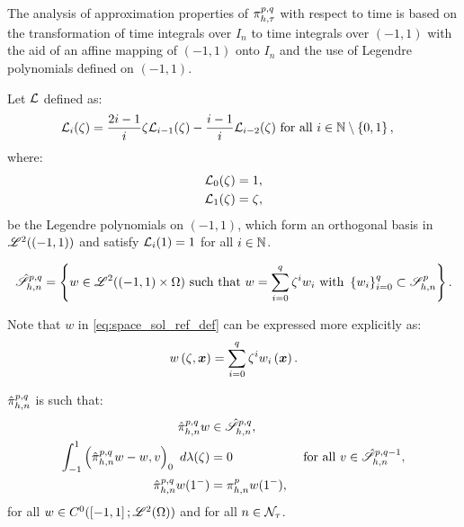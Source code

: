 The analysis of approximation properties of $\pi_{h, \tau}^{p, q}$ with respect to time is based on the transformation of time integrals over $I_n$ to time integrals over $\left( -1, 1 \right)$ with the aid of an affine mapping of $\left( -1, 1 \right)$ onto $I_n$ and the use of Legendre polynomials defined on $\left( -1, 1 \right)$.

\begin{definition}
    Let $\mathcal{L}$ defined as:
    \begin{align}
        \mathcal{L}_{i}(\zeta) = \frac{2i - 1}{i} \zeta \mathcal{L}_{i - 1}(\zeta) - \frac{i - 1}{i} \mathcal{L}_{i - 2}(\zeta) &\text{ for all } i \in \mathbb{N} \setminus \left\{ 0, 1 \right\},
    \end{align}
    where:
    \begin{align}
        \mathcal{L}_{0}(\zeta) &= 1, \\
        \mathcal{L}_{1}(\zeta) &= \zeta,
    \end{align}
    be the Legendre polynomials on $\left( -1, 1 \right)$, which form an orthogonal basis in $\mathscr{L}^{2}(\left( -1, 1 \right))$ and satisfy $\mathcal{L}_i(1) = 1$ for all $i \in \mathbb{N}$.
\end{definition}

\begin{definition}[$\SpaceSolutionReference$]
    \begin{align}
        \hat{\mathscr{S}}^{p, q}_{h, n} = \left\{ w \in \mathscr{L}^{2}(\left( -1, 1 \right) \times \Omega) \text{ such that } w = \sum_{i = 0}^q \zeta^i w_i \text{ with } \left\{ w_i \right\}_{i = 0}^q \subset \mathscr{S}_{h, n}^p \right\}. \label{eq:space_sol_ref_def}
    \end{align}
\end{definition}

Note that $w$ in \cref{eq:space_sol_ref_def} can be expressed more explicitly as:
\begin{align}
    w \left( \zeta, \bm{x} \right) = \sum_{i = 0}^q \zeta^i w_i \left( \bm{x} \right).
\end{align}

\begin{definition}[$\InterpolantPQR$] \label{definition:interpolant_ref_qp}
    $\InterpolantPQR$ is such that:
    \begin{align}
        \hat{\pi}_{h, n}^{p, q} w &\in \hat{\mathscr{S}}^{p, q}_{h, n}, \\
        \int_{-1}^1 \left( \hat{\pi}_{h, n}^{p, q} w - w, v \right)_0 ~ d \lambda(\zeta) &= 0 &\text{ for all } v \in \hat{\mathscr{S}}^{p, q - 1}_{h, n}, \\ 
        \hat{\pi}_{h, n}^{p, q} w(1^-) &= \pi_{h, n}^p w(1^-),
    \end{align}
    for all $w \in C^0(\left[ -1, 1 \right]; \mathscr{L}^{2}(\Omega))$ and for all $n \in \mathcal{N}_{\tau}$.
\end{definition}

